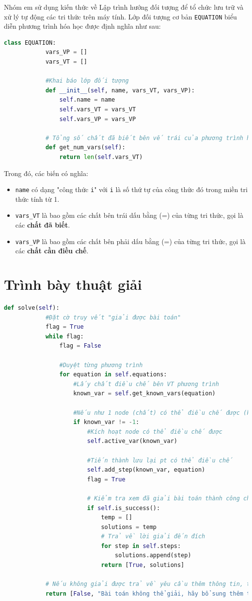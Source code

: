 \documentclass[a4paper]{article}
\begin{document}
	Nhóm em sử dụng kiến thức về Lập trình hướng đối tượng để tổ chức lưu trữ và xử lý tự động các tri thức trên máy tính. Lớp đối tượng cơ bản \texttt{EQUATION} biểu diễn phương trình hóa học được định nghĩa như sau:
	\begin{lstlisting}[language=Python, caption=Lớp đối tượng EQUATION]
		class EQUATION:
			vars_VP = []
			vars_VT = []
			
			#Khai báo lớp đối tượng
			def __init__(self, name, vars_VT, vars_VP):
				self.name = name
				self.vars_VT = vars_VT
				self.vars_VP = vars_VP
			
			# Tổng số chất đã biết bên vế trái của phương trình hóa học
			def get_num_vars(self):
				return len(self.vars_VT)
	\end{lstlisting}
	Trong đó, các biến có nghĩa:
	\begin{itemize}
		\item \texttt{name} có dạng "công thức \texttt{i}" với \texttt{i} là số thứ tự của công thức đó trong miền tri thức tính từ 1.
		\item \texttt{vars\_VT} là bao gồm các chất bên trái dấu bằng (=) của từng tri thức, gọi là các \textbf{chất đã biết}.
		\item \texttt{vars\_VP} là bao gồm các chất bên phải dấu bằng (=) của từng tri thức, gọi là các \textbf{chất cần điều chế}.
	\end{itemize}
	
	\section{Trình bày thuật giải}
	\begin{lstlisting}[language=Python, caption=Thuật giải mạng ngữ nghĩa điều chế]
		def solve(self):
			#Đặt cờ truy vết "giải được bài toán"
			flag = True
			while flag:
				flag = False
					
				#Duyệt từng phương trình
				for equation in self.equations:
					#Lấy chất điều chế bên VT phương trình
					known_var = self.get_known_vars(equation)
					
					#Nếu như 1 node (chất) có thể điều chế được (khác -1)
					if known_var != -1:
						#Kích hoạt node có thể điều chế được
						self.active_var(known_var)
						
						#Tiến thành lưu lại pt có thể điều chế
						self.add_step(known_var, equation)
						flag = True
						
						# Kiểm tra xem đã giải bài toán thành công chưa?
						if self.is_success():
							temp = []
							solutions = temp
							# Trả về lời giải đến đích
							for step in self.steps:
								solutions.append(step)
							return [True, solutions]
						
			# Nếu không giải được trả về yêu cầu thêm thông tin, tri thức
			return [False, "Bài toán không thể giải, hãy bổ sung thêm thông tin hoặc tri thức."]
	\end{lstlisting}
	
\end{document}
